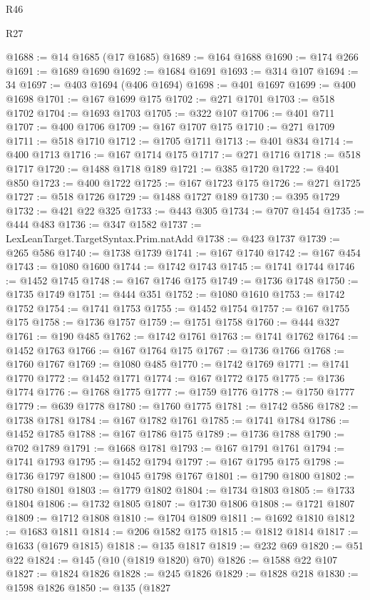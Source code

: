 \begin{lexlean}{R46}
\begin{lexlean}{R27}
\begin{coremodule}
{{{{{{{{{{{{{{{{{{{{{{{{{{{{{{{{{{{{{{{{{{{{{{{{{{{{{{{{{{{{{{@1688 := @14 @1685 (@17 @1685)
@1689 := @164 @1688
@1690 := @174 @266
@1691 := @1689 @1690
@1692 := @1684 @1691
@1693 := @314 @107
@1694 := 34
@1697 := @403 @1694 (@406 @1694)
@1698 := @401 @1697
@1699 := @400 @1698
@1701 := @167 @1699 @175
@1702 := @271 @1701
@1703 := @518 @1702
@1704 := @1693 @1703
@1705 := @322 @107
@1706 := @401 @711
@1707 := @400 @1706
@1709 := @167 @1707 @175
@1710 := @271 @1709
@1711 := @518 @1710
@1712 := @1705 @1711
@1713 := @401 @834
@1714 := @400 @1713
@1716 := @167 @1714 @175
@1717 := @271 @1716
@1718 := @518 @1717
@1720 := @1488 @1718 @189
@1721 := @385 @1720
@1722 := @401 @850
@1723 := @400 @1722
@1725 := @167 @1723 @175
@1726 := @271 @1725
@1727 := @518 @1726
@1729 := @1488 @1727 @189
@1730 := @395 @1729
@1732 := @421 @22 @325
@1733 := @443 @305
@1734 := @707 @1454
@1735 := @444 @483
@1736 := @347 @1582
@1737 := LexLeanTarget.TargetSyntax.Prim.natAdd
@1738 := @423 @1737
@1739 := @265 @586
@1740 := @1738 @1739
@1741 := @167 @1740
@1742 := @167 @454
@1743 := @1080 @1600
@1744 := @1742 @1743
@1745 := @1741 @1744
@1746 := @1452 @1745
@1748 := @167 @1746 @175
@1749 := @1736 @1748
@1750 := @1735 @1749
@1751 := @444 @351
@1752 := @1080 @1610
@1753 := @1742 @1752
@1754 := @1741 @1753
@1755 := @1452 @1754
@1757 := @167 @1755 @175
@1758 := @1736 @1757
@1759 := @1751 @1758
@1760 := @444 @327
@1761 := @190 @485
@1762 := @1742 @1761
@1763 := @1741 @1762
@1764 := @1452 @1763
@1766 := @167 @1764 @175
@1767 := @1736 @1766
@1768 := @1760 @1767
@1769 := @1080 @485
@1770 := @1742 @1769
@1771 := @1741 @1770
@1772 := @1452 @1771
@1774 := @167 @1772 @175
@1775 := @1736 @1774
@1776 := @1768 @1775
@1777 := @1759 @1776
@1778 := @1750 @1777
@1779 := @639 @1778
@1780 := @1760 @1775
@1781 := @1742 @586
@1782 := @1738 @1781
@1784 := @167 @1782 @1761
@1785 := @1741 @1784
@1786 := @1452 @1785
@1788 := @167 @1786 @175
@1789 := @1736 @1788
@1790 := @702 @1789
@1791 := @1668 @1781
@1793 := @167 @1791 @1761
@1794 := @1741 @1793
@1795 := @1452 @1794
@1797 := @167 @1795 @175
@1798 := @1736 @1797
@1800 := @1045 @1798 @1767
@1801 := @1790 @1800
@1802 := @1780 @1801
@1803 := @1779 @1802
@1804 := @1734 @1803
@1805 := @1733 @1804
@1806 := @1732 @1805
@1807 := @1730 @1806
@1808 := @1721 @1807
@1809 := @1712 @1808
@1810 := @1704 @1809
@1811 := @1692 @1810
@1812 := @1683 @1811
@1814 := @206 @1582 @175
@1815 := @1812 @1814
@1817 := @1633 (@1679 @1815)
@1818 := @135 @1817
@1819 := @232 @69
@1820 := @51 @22
@1824 := @145 (@10 (@1819 @1820) @70)
@1826 := @1588 @22 @107
@1827 := @1824 @1826
@1828 := @245 @1826
@1829 := @1828 @218
@1830 := @1598 @1826
@1850 := @135
    (@1827
}}}}}}}}}}}}}}}}}}}}}}}}}}}}}}}}}}}}}}}}}}}}}}}}}}}}}}}}}}}}}}
\end{coremodule}
\end{lexlean}
\end{lexlean}
